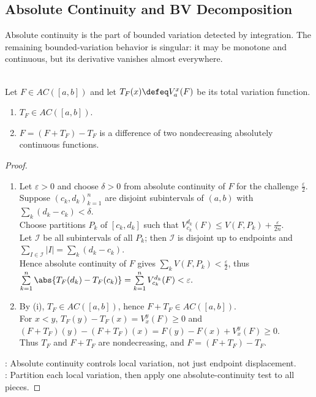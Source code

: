 \subsection{Absolute Continuity and BV Decomposition}

Absolute continuity is the part of bounded variation detected by integration. The remaining bounded-variation behavior is singular: it may be monotone and continuous, but its derivative vanishes almost everywhere.

\begin{proposition} \label{prop:absolute-continuity-variation-function} \\
Let $F\in AC([a,b])$ and let $T_F(x)\defeq V_a^x(F)$ be its total variation function.
\begin{enumerate}[label=(\roman*)]
\setlength{\itemsep}{0pt}
\item $T_F\in AC([a,b])$.
\item $F=(F+T_F)-T_F$ is a difference of two nondecreasing absolutely continuous functions.
\end{enumerate}
\begin{proof}
\begin{enumerate}[label=(\roman*)]
\setlength{\itemsep}{0pt}
\item Let $\varepsilon>0$ and choose $\delta>0$ from absolute continuity of $F$ for the challenge $\frac{\varepsilon}{2}$.\\
Suppose $(c_k,d_k)_{k=1}^n$ are disjoint subintervals of $(a,b)$ with $\sum\limits_k(d_k-c_k)<\delta$.\\
Choose partitions $P_k$ of $[c_k,d_k]$ such that $V_{c_k}^{d_k}(F)\leq V(F,P_k)+\frac{\varepsilon}{2n}$.\\
Let $\mathcal I$ be all subintervals of all $P_k$; then $\mathcal I$ is disjoint up to endpoints and $\sum\limits_{I\in\mathcal I}|I|=\sum\limits_k(d_k-c_k)$.\\
Hence absolute continuity of $F$ gives $\sum\limits_kV(F,P_k)<\frac{\varepsilon}{2}$, thus $\sum\limits_{k=1}^n\abs{T_F(d_k)-T_F(c_k)} =\sum\limits_{k=1}^nV_{c_k}^{d_k}(F)<\varepsilon.$
\item By (i), $T_F\in AC([a,b])$, hence $F+T_F\in AC([a,b])$.\\
For $x<y$, $T_F(y)-T_F(x)=V_x^y(F)\geq0$ and $(F+T_F)(y)-(F+T_F)(x)=F(y)-F(x)+V_x^y(F)\geq0$.\\
Thus $T_F$ and $F+T_F$ are nondecreasing, and $F=(F+T_F)-T_F$.
\end{enumerate}
: Absolute continuity controls local variation, not just endpoint displacement.\\
: Partition each local variation, then apply one absolute-continuity test to all pieces.
\end{proof}
\end{proposition}

